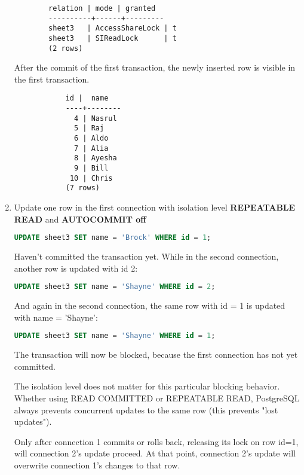 \documentclass{article}
\begin{document}
\begin{enumerate}[label=\alph*)]
        \begin{lstlisting}
        relation | mode | granted 
        ----------+------+---------
        sheet3   | AccessShareLock | t
        sheet3   | SIReadLock      | t
        (2 rows)
        \end{lstlisting}
        
        After the commit of the first transaction, the newly inserted row is visible in the first transaction.

        \begin{lstlisting}
            id |  name  
            ----+--------
              4 | Nasrul
              5 | Raj
              6 | Aldo
              7 | Alia
              8 | Ayesha
              9 | Bill
             10 | Chris
            (7 rows)
        \end{lstlisting}

        \item Update one row in the first connection with isolation level \textbf{REPEATABLE READ} and \textbf{AUTOCOMMIT off}
        
        \begin{lstlisting}[language=sql]
UPDATE sheet3 SET name = 'Brock' WHERE id = 1;
        \end{lstlisting}

        Haven't committed the transaction yet.
        While in the second connection, another row is updated with id 2:

        \begin{lstlisting}[language=sql]
UPDATE sheet3 SET name = 'Shayne' WHERE id = 2;
        \end{lstlisting}

        And again in the second connection, the same row with id = 1 is updated with name = 'Shayne':

        \begin{lstlisting}[language=sql]
UPDATE sheet3 SET name = 'Shayne' WHERE id = 1;
        \end{lstlisting}

        The transaction will now be blocked, because the first connection has not yet committed.

        The isolation level does not matter for this particular blocking behavior. Whether using READ COMMITTED or REPEATABLE READ, PostgreSQL always prevents concurrent updates to the same row (this prevents "lost updates").

        Only after connection 1 commits or rolls back, releasing its lock on row id=1, will connection 2's update proceed. At that point, connection 2's update will overwrite connection 1's changes to that row.

        \end{enumerate}
    
\end{document}
